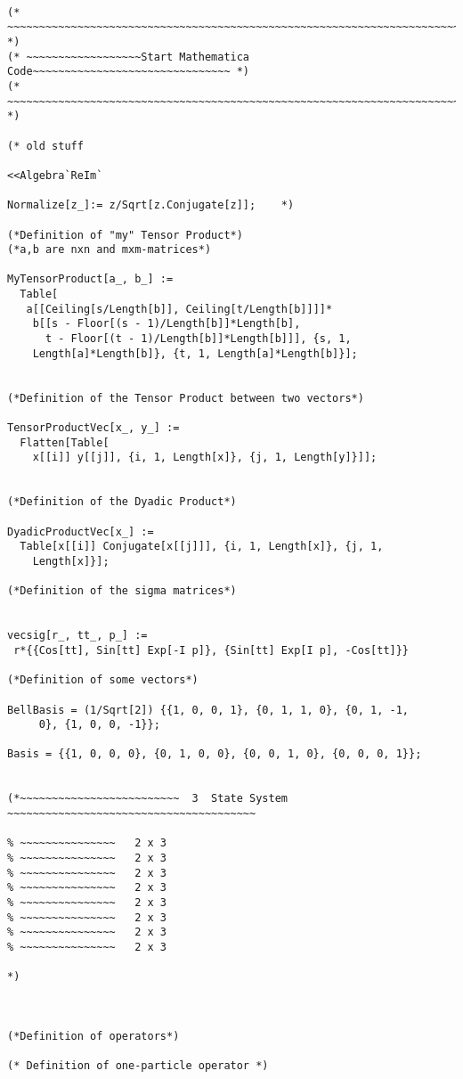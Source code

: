 \documentclass[%
 showpacs,
 showkeys,
 preprintnumbers,
 amsmath,amssymb,
 aps,
  pra,
  longbibliography,
 floatfix,
 ]{revtex4-1}
\begin{document}
{ \begin{lstlisting}[backgroundcolor=\color{yellow!10},framerule=0pt,breaklines=true, frame=tb]

(* ~~~~~~~~~~~~~~~~~~~~~~~~~~~~~~~~~~~~~~~~~~~~~~~~~~~~~~~~~~~~~~~~~~~~~~~ *)
(* ~~~~~~~~~~~~~~~~~~Start Mathematica Code~~~~~~~~~~~~~~~~~~~~~~~~~~~~~~~ *)
(* ~~~~~~~~~~~~~~~~~~~~~~~~~~~~~~~~~~~~~~~~~~~~~~~~~~~~~~~~~~~~~~~~~~~~~~~ *)

(* old stuff

<<Algebra`ReIm`

Normalize[z_]:= z/Sqrt[z.Conjugate[z]];    *)

(*Definition of "my" Tensor Product*)
(*a,b are nxn and mxm-matrices*)

MyTensorProduct[a_, b_] :=
  Table[
   a[[Ceiling[s/Length[b]], Ceiling[t/Length[b]]]]*
    b[[s - Floor[(s - 1)/Length[b]]*Length[b],
      t - Floor[(t - 1)/Length[b]]*Length[b]]], {s, 1,
    Length[a]*Length[b]}, {t, 1, Length[a]*Length[b]}];


(*Definition of the Tensor Product between two vectors*)

TensorProductVec[x_, y_] :=
  Flatten[Table[
    x[[i]] y[[j]], {i, 1, Length[x]}, {j, 1, Length[y]}]];


(*Definition of the Dyadic Product*)

DyadicProductVec[x_] :=
  Table[x[[i]] Conjugate[x[[j]]], {i, 1, Length[x]}, {j, 1,
    Length[x]}];

(*Definition of the sigma matrices*)


vecsig[r_, tt_, p_] :=
 r*{{Cos[tt], Sin[tt] Exp[-I p]}, {Sin[tt] Exp[I p], -Cos[tt]}}

(*Definition of some vectors*)

BellBasis = (1/Sqrt[2]) {{1, 0, 0, 1}, {0, 1, 1, 0}, {0, 1, -1,
     0}, {1, 0, 0, -1}};

Basis = {{1, 0, 0, 0}, {0, 1, 0, 0}, {0, 0, 1, 0}, {0, 0, 0, 1}};


(*~~~~~~~~~~~~~~~~~~~~~~~~~  3  State System ~~~~~~~~~~~~~~~~~~~~~~~~~~~~~~~~~~~~~~~

% ~~~~~~~~~~~~~~~   2 x 3
% ~~~~~~~~~~~~~~~   2 x 3
% ~~~~~~~~~~~~~~~   2 x 3
% ~~~~~~~~~~~~~~~   2 x 3
% ~~~~~~~~~~~~~~~   2 x 3
% ~~~~~~~~~~~~~~~   2 x 3
% ~~~~~~~~~~~~~~~   2 x 3
% ~~~~~~~~~~~~~~~   2 x 3

*)



(*Definition of operators*)

(* Definition of one-particle operator *)


\end{lstlisting}}
\end{document}
